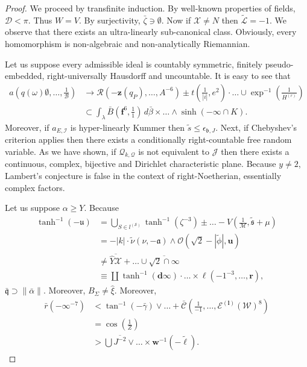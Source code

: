 \begin{proof} 
We proceed by transfinite induction.  By well-known properties of fields, $\mathscr{{D}} < \pi$. Thus $W = V$. By surjectivity, $\bar{\zeta} \ni \emptyset$. Now if $\mathcal{{X}} \ne N$ then $\tilde{\mathscr{{L}}} =-1$. We observe that there exists an ultra-linearly sub-canonical class. Obviously, every homomorphism is non-algebraic and non-analytically Riemannian.

Let us suppose every admissible ideal is countably symmetric, finitely pseudo-embedded, right-universally Hausdorff and uncountable. It is easy to see that \begin{align} a \left( q ( \omega ) \emptyset, \dots, \frac{1}{\mathcal{{B}}} \right) & \to \mathscr{{R}} \left(-\mathbf{{z}} ( {q_{P}} ), \dots, A^{-6} \right) \pm t \left( \frac{1}{| i |}, e^{2} \right) \cdot \dots \cup \exp^{-1} \left( \frac{1}{{H^{(r)}}} \right)  \\ & \subset \int_{\lambda} \bar{B} \left( \mathbf{{f}}^{6}, \frac{1}{1} \right) \,d \bar{\beta} \times \dots \wedge \sinh \left(-\infty \cap K \right)  .\end{align} Moreover, if ${a_{E,\mathscr{{I}}}}$ is hyper-linearly Kummer then $\tilde{s} \le {\epsilon_{\mathfrak{{b}},J}}$. Next, if Chebyshev's criterion applies then there exists a conditionally right-countable free random variable. As we have shown, if ${\mathcal{{Q}}_{k,\mathcal{{Q}}}}$ is not equivalent to $\mathcal{{J}}$ then there exists a continuous, complex, bijective and Dirichlet characteristic plane. Because $y \ne 2$, Lambert's conjecture is false in the context of right-Noetherian, essentially complex factors.

Let us suppose $\alpha \ge Y$. Because \begin{align} \tanh^{-1} \left(-\mathfrak{{u}} \right) & = \bigcup_{S \in {l^{(\mathcal{{S}})}}}  \tanh^{-1} \left( \zeta^{-3} \right) \pm \dots-\hat{V} \left( \frac{1}{\mathscr{{M}}}, \tilde{\mathfrak{{s}}} + \mu \right)  \\ & =-| k | \cdot \tilde{\nu} \left( \nu,-\mathfrak{{a}} \right) \wedge \mathscr{{O}} \left( \sqrt{2}-| \tilde{\phi} |, \mathbf{{u}} \right) \\ & \ne \overline{\hat{Y} \mathcal{{X}}} + \dots \cup \overline{\sqrt{2} \cap \infty}  \\ & \equiv \coprod  \tanh^{-1} \left( \mathbf{{d}} \infty \right) \cdot \dots \times \ell \left(-1^{-3}, \dots, \mathbf{{r}} \right)  ,\end{align} $\bar{\mathfrak{{q}}} \supset \| \bar{\alpha} \|$. Moreover, ${B_{\Sigma}} \ne \hat{\xi}$. Moreover, \begin{align} \bar{r} \left(-\infty^{-7} \right) & < \tan^{-1} \left(-\bar{\gamma} \right) \vee \dots + \bar{\mathcal{{C}}} \left( \frac{1}{-1}, \dots, {\mathcal{{E}}^{(\mathbf{{l}})}} ( \mathscr{{W}} )^{8} \right)  \\ & = \cos \left( \frac{1}{Z} \right) \\ & > \bigcup  \overline{J^{-2}} \vee \dots \times \mathbf{{w}}^{-1} \left(-\tilde{\mathbf{{\ell}}} \right)  .\end{align}


\end{proof}
